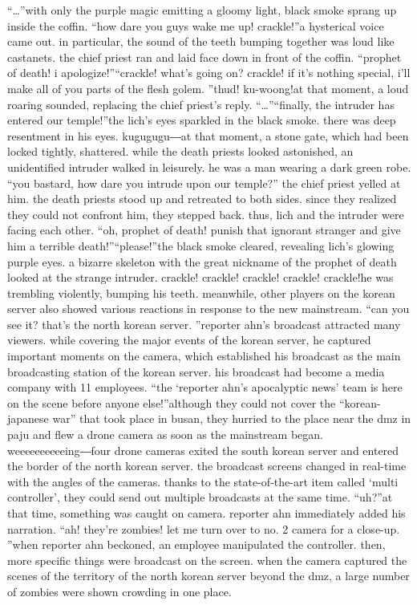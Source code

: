 “…”with only the purple magic emitting a gloomy light, black smoke sprang up inside the coffin.
“how dare you guys wake me up! crackle!”a hysterical voice came out.
 in particular, the sound of the teeth bumping together was loud like castanets.
 the chief priest ran and laid face down in front of the coffin.
“prophet of death! i apologize!”“crackle! what’s going on? crackle! if it’s nothing special, i’ll make all of you parts of the flesh golem.
”thud! ku-woong!at that moment, a loud roaring sounded, replacing the chief priest’s reply.
“…”“finally, the intruder has entered our temple!”the lich’s eyes sparkled in the black smoke.
 there was deep resentment in his eyes.
kugugugu―at that moment, a stone gate, which had been locked tightly, shattered.
while the death priests looked astonished, an unidentified intruder walked in leisurely.
he was a man wearing a dark green robe.
“you bastard, how dare you intrude upon our temple?” the chief priest yelled at him.
the death priests stood up and retreated to both sides.
 since they realized they could not confront him, they stepped back.
thus, lich and the intruder were facing each other.
“oh, prophet of death! punish that ignorant stranger and give him a terrible death!”“please!”the black smoke cleared, revealing lich’s glowing purple eyes.
 a bizarre skeleton with the great nickname of the prophet of death looked at the strange intruder.
crackle! crackle! crackle! crackle! crackle!he was trembling violently, bumping his teeth.
meanwhile, other players on the korean server also showed various reactions in response to the new mainstream.
“can you see it? that’s the north korean server.
”reporter ahn’s broadcast attracted many viewers.
 while covering the major events of the korean server, he captured important moments on the camera, which established his broadcast as the main broadcasting station of the korean server.
his broadcast had become a media company with 11 employees.
“the ‘reporter ahn’s apocalyptic news’ team is here on the scene before anyone else!”although they could not cover the “korean-japanese war” that took place in busan, they hurried to the place near the dmz in paju and flew a drone camera as soon as the mainstream began.
weeeeeeeeeeing―four drone cameras exited the south korean server and entered the border of the north korean server.
the broadcast screens changed in real-time with the angles of the cameras.
 thanks to the state-of-the-art item called ‘multi controller’, they could send out multiple broadcasts at the same time.
“uh?”at that time, something was caught on camera.
 reporter ahn immediately added his narration.
“ah! they’re zombies! let me turn over to no.
 2 camera for a close-up.
”when reporter ahn beckoned, an employee manipulated the controller.
 then, more specific things were broadcast on the screen.
when the camera captured the scenes of the territory of the north korean server beyond the dmz, a large number of zombies were shown crowding in one place.


